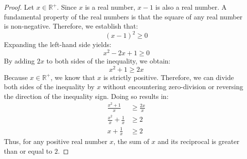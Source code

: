 \documentclass[12pt]{amsart}
\begin{document}
\begin{proof}
Let $x \in \mathbb{R}^+$. Since $x$ is a real number, $x-1$ is also a real number. A fundamental property of the real numbers is that the square of any real number is non-negative. Therefore, we establish that:
\[
    (x-1)^2 \ge 0
\]
Expanding the left-hand side yields:
\[
    x^2 - 2x + 1 \ge 0
\]
By adding $2x$ to both sides of the inequality, we obtain:
\[
    x^2 + 1 \ge 2x
\]
Because $x \in \mathbb{R}^+$, we know that $x$ is strictly positive. Therefore, we can divide both sides of the inequality by $x$ without encountering zero-division or reversing the direction of the inequality sign. Doing so results in:
\begin{align*}
    \frac{x^2 + 1}{x} &\ge \frac{2x}{x} \\
    \frac{x^2}{x} + \frac{1}{x} &\ge 2 \\
    x + \frac{1}{x} &\ge 2
\end{align*}
Thus, for any positive real number $x$, the sum of $x$ and its reciprocal is greater than or equal to $2$.
\end{proof}
\end{document}
